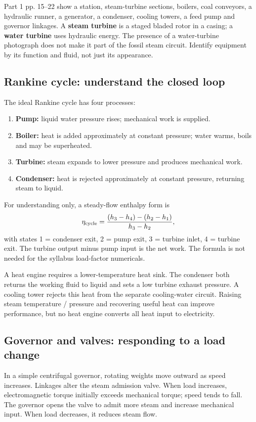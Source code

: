\documentclass[11pt,a4paper]{article}
\newenvironment{Idea}[1]{\begin{tcolorbox}[colback=pale,colframe=teal,coltitle=white,title={#1}]}{\end{tcolorbox}}
\newenvironment{Caution}[1]{\begin{tcolorbox}[colback=warm,colframe=rust,coltitle=white,title={#1}]}{\end{tcolorbox}}
\begin{document}
\begin{Caution}{Recognise the class photographs}
Part 1 pp. 15--22 show a station, steam-turbine sections, boilers, coal conveyors, a hydraulic runner, a generator, a condenser, cooling towers, a feed pump and governor linkages. A \textbf{steam turbine} is a staged bladed rotor in a casing; a \textbf{water turbine} uses hydraulic energy. The presence of a water-turbine photograph does not make it part of the fossil steam circuit. Identify equipment by its function and fluid, not just its appearance.
\end{Caution}

\subsection{Rankine cycle: understand the closed loop}
The ideal Rankine cycle has four processes:
\begin{enumerate}
\item \textbf{Pump:} liquid water pressure rises; mechanical work is supplied.
\item \textbf{Boiler:} heat is added approximately at constant pressure; water warms, boils and may be superheated.
\item \textbf{Turbine:} steam expands to lower pressure and produces mechanical work.
\item \textbf{Condenser:} heat is rejected approximately at constant pressure, returning steam to liquid.
\end{enumerate}
For understanding only, a steady-flow enthalpy form is
\[
\eta_{\rm cycle}=\frac{(h_3-h_4)-(h_2-h_1)}{h_3-h_2},
\]
with states 1 = condenser exit, 2 = pump exit, 3 = turbine inlet, 4 = turbine exit. The turbine output minus pump input is the net work. The formula is not needed for the syllabus load-factor numericals.

\begin{Idea}{Why condenser heat is not simply avoidable waste}
A heat engine requires a lower-temperature heat sink. The condenser both returns the working fluid to liquid and sets a low turbine exhaust pressure. A cooling tower rejects this heat from the separate cooling-water circuit. Raising steam temperature / pressure and recovering useful heat can improve performance, but no heat engine converts all heat input to electricity.
\end{Idea}

\subsection{Governor and valves: responding to a load change}
In a simple centrifugal governor, rotating weights move outward as speed increases. Linkages alter the steam admission valve. When load increases, electromagnetic torque initially exceeds mechanical torque; speed tends to fall. The governor opens the valve to admit more steam and increase mechanical input. When load decreases, it reduces steam flow.
\end{document}
